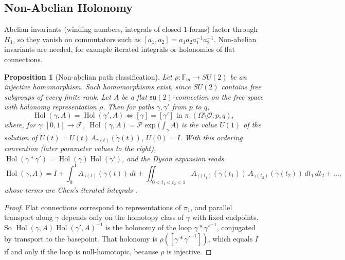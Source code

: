 \documentclass[11pt,reqno]{amsart}
\newtheorem{proposition}[theorem]{Proposition}
\theoremstyle{definition}
\numberwithin{equation}{section}
\begin{document}
\subsection{Non-Abelian Holonomy}
Abelian invariants (winding numbers, integrals of closed $1$-forms) factor through $H_1$, so they vanish on commutators such as $[a_1, a_2] = a_1 a_2 a_1^{-1} a_2^{-1}$. Non-abelian invariants are needed, for example iterated integrals \cite{chen1977} or holonomies of flat connections.

\begin{proposition}[Non-abelian path classification]
\label{prop:holonomy}
Let $\rho: \mathbb{F}_m \to SU(2)$ be an injective homomorphism. Such homomorphisms exist, since $SU(2)$ contains free subgroups of every finite rank. Let $A$ be a flat $\mathfrak{su}(2)$-connection on the free space with holonomy representation $\rho$. Then for paths $\gamma, \gamma'$ from $p$ to $q$,
\begin{equation}
\operatorname{Hol}(\gamma, A) = \operatorname{Hol}(\gamma', A) \iff [\gamma] = [\gamma'] \text{ in } \pi_1(\Omega \setminus \mathcal{O}, p, q),
\end{equation}
where, for $\gamma \colon [0,1] \to \mathcal{F}$, $\operatorname{Hol}(\gamma, A) = \mathcal{P}\exp\big(\int_\gamma A\big)$ is the value $U(1)$ of the solution of $\dot U(t) = U(t)\,A_{\gamma(t)}(\dot\gamma(t))$, $U(0) = I$. With this ordering convention (later parameter values to the right), $\operatorname{Hol}(\gamma * \gamma') = \operatorname{Hol}(\gamma)\operatorname{Hol}(\gamma')$, and the Dyson expansion reads
\begin{equation*}
\operatorname{Hol}(\gamma, A) = I + \int_0^1 A_{\gamma(t)}(\dot\gamma(t))\,dt + \iint_{0 < t_1 < t_2 < 1} A_{\gamma(t_1)}(\dot\gamma(t_1))\, A_{\gamma(t_2)}(\dot\gamma(t_2))\,dt_1\,dt_2 + \dots,
\end{equation*}
whose terms are Chen's iterated integrals \cite{chen1977}.
\end{proposition}

\begin{proof}
Flat connections correspond to representations of $\pi_1$, and parallel transport along $\gamma$ depends only on the homotopy class of $\gamma$ with fixed endpoints. So $\operatorname{Hol}(\gamma,A)\operatorname{Hol}(\gamma',A)^{-1}$ is the holonomy of the loop $\gamma * \gamma'^{-1}$, conjugated by transport to the basepoint. That holonomy is $\rho([\gamma * \gamma'^{-1}])$, which equals $I$ if and only if the loop is null-homotopic, because $\rho$ is injective.
\end{proof}
\end{document}
